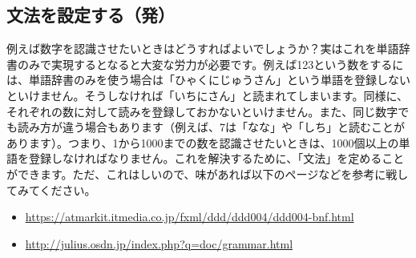 \subsection{文法を設定する（発）}
例えば数字を認識させたいときはどうすればよいでしょうか？実はこれを単語辞書のみで実現するとなると大変な労力が必要です。例えば123という数をするには、単語辞書のみを使う場合は「ひゃくにじゅうさん」という単語を登録しないといけません。そうしなければ「いちにさん」と読まれてしまいます。同様に、それぞれの数に対して読みを登録しておかないといけません。また、同じ数字でも読み方が違う場合もあります（例えば、7は「なな」や「しち」と読むことがあります）。つまり、1から1000までの数を認識させたいときは、1000個以上の単語を登録しなければなりません。これを解決するために、「文法」を定めることができます。ただ、これはしいので、味があれば以下のページなどを参考に戦してみてください。
\begin{itemize}
\item \url{https://atmarkit.itmedia.co.jp/fxml/ddd/ddd004/ddd004-bnf.html}
\item \url{http://julius.osdn.jp/index.php?q=doc/grammar.html}
\end{itemize}
